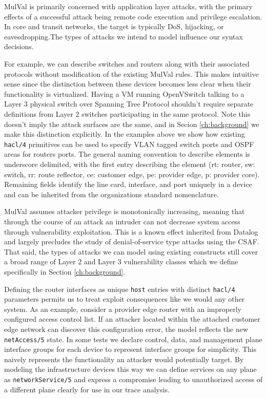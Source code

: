 MulVal is primarily concerned with application layer attacks, with the primary effects of a successful attack being remote code execution and privilege escalation. In core and transit networks, the target is typically DoS, hijacking, or eavesdropping.The types of attacks we intend to model influence our syntax decisions.

For example, we can describe switches and routers along with their associated protocols without modification of the existing MulVal rules. This makes intuitive sense since the distinction between these devices becomes less clear when their functionality is virtualized. Having a VM running OpenVSwitch talking to a Layer 3 physical switch over Spanning Tree Protocol shouldn't require separate definitions from Layer 2 switches participating in the same protocol. Note this doesn't imply the attack surfaces are the same, and in Secion \ref{ch:background} we make this distinction explicitly. In the examples above we show how existing \verb|hacl/4| primitives can be used to specify VLAN tagged switch ports and OSPF areas for routers ports. The general naming convention to describe elements is underscore delimited, with the first entry describing the element (rt: router, sw: switch, rr: route reflector, ce: customer edge, pe: provider edge, p: provider core). Remaining fields identify the line card, interface, and port uniquely in a device and can be inherited from the organizations standard nomenclature. 

MulVal assumes attacker privilege is monotonically increasing, meaning that through the course of an attack an intruder can not decrease system access through vulnerability exploitation. This is a known\cite[Ch 2.6]{Ou_Appel_2005} effect inherited from Datalog and largely precludes the study of denial-of-service type attacks using the CSAF. That said, the types of attacks we can model using existing constructs still cover a broad range of Layer 2 and Layer 3 vulnerability classes which we define specifically in Section \ref{ch:background}.  


Defining the router interfaces as unique \verb|host| entries with distinct \verb|hacl/4| parameters permits us to treat exploit consequences like we would any other system. As an example, consider a provider edge router with an improperly configured access control list. If an attacker located within the attached customer edge network can discover this configuration error, the model reflects the new \verb|netAccess/5| state. In some tests we declare control, data, and management plane interface groups for each device to represent interface groups for simplicity. This naively represents the functionality an attacker would potentially target. By modeling the infrastructure devices this way we can define services on any plane as \verb|networkService/5| and express a compromise leading to unauthorized access of a different plane clearly for use in our trace analysis. 

